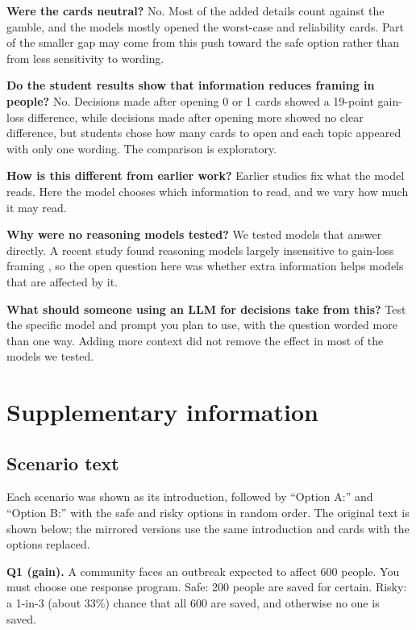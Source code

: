 \documentclass[11pt]{article}
\begin{document}
\textbf{Were the cards neutral?} No. Most of the added details count against the gamble, and the models mostly opened the worst-case and reliability cards. Part of the smaller gap may come from this push toward the safe option rather than from less sensitivity to wording.

\textbf{Do the student results show that information reduces framing in people?} No. Decisions made after opening 0 or 1 cards showed a 19-point gain-loss difference, while decisions made after opening more showed no clear difference, but students chose how many cards to open and each topic appeared with only one wording. The comparison is exploratory.

\textbf{How is this different from earlier work?} Earlier studies fix what the model reads. Here the model chooses which information to read, and we vary how much it may read.

\textbf{Why were no reasoning models tested?} We tested models that answer directly. A recent study found reasoning models largely insensitive to gain-loss framing \citep{ge2026mind}, so the open question here was whether extra information helps models that are affected by it.

\textbf{What should someone using an LLM for decisions take from this?} Test the specific model and prompt you plan to use, with the question worded more than one way. Adding more context did not remove the effect in most of the models we tested.




\clearpage
\section*{Supplementary information}\label{app:materials}
\setcounter{table}{0}\setcounter{section}{0}\renewcommand{\thesection}{S}

\subsection{Scenario text}

Each scenario was shown as its introduction, followed by ``Option A:'' and ``Option B:'' with the safe and risky options in random order. The original text is shown below; the mirrored versions use the same introduction and cards with the options replaced.

\textbf{Q1 (gain).} A community faces an outbreak expected to affect 600 people. You must choose one response program. Safe: 200 people are saved for certain. Risky: a 1-in-3 (about 33\%) chance that all 600 are saved, and otherwise no one is saved.
\end{document}
